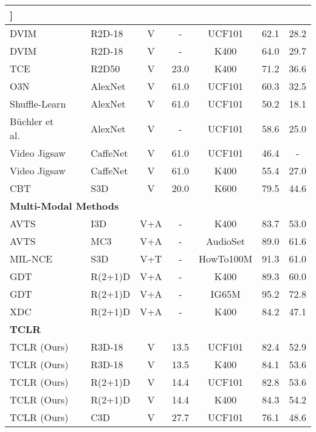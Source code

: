 \documentclass[10pt,twocolumn,letterpaper]{article}
\begin{document}
\begin{table*}[h!]
\centering
\begin{tabular}{lclccccc} 
\hline

\hline

\hline\-3mm]\multicolumn{8}{l}{\textbf{Specialized Architectures}} \\
\hline
DVIM~\cite{dvim}          &         & R2D-18     & V & -            & UCF101 & 62.1  & 28.2     \\
DVIM~\cite{dvim}          &         & R2D-18     & V & -            & K400 & 64.0  & 29.7   \\
TCE~\cite{tce}                 &         & R2D50& V          & 23.0         & K400 & 71.2  & 36.6   \\ 
O3N~\cite{fernando2017self}      &         & AlexNet& V           & 61.0         & UCF101 & 60.3  & 32.5      \\ 
Shuffle-Learn~\cite{misra2016shuffle}              &         & AlexNet& V           & 61.0         & UCF101 & 50.2  & 18.1       \\ 
B\"uchler et al.~\cite{buchler2018improving} &         & AlexNet& V  & -            & UCF101 & 58.6  & 25.0        \\ 
Video Jigsaw~\cite{videojigsaw}             &        & CaffeNet& V          & 61.0         & UCF101 & 46.4  & -     \\
Video Jigsaw~\cite{videojigsaw}             &        & CaffeNet& V          & 61.0         & K400  & 55.4  & 27.0   \\
CBT~\cite{xdc}                  &        & S3D & V               & 20.0         & K600  & 79.5  & 44.6   \\ 


\hline
\multicolumn{8}{l}{\textbf{Multi-Modal Methods}} \\
\hline
AVTS~\cite{gdt} &   & I3D & V+A & - & K400 & 83.7 & 53.0 \\
AVTS~\cite{gdt} &   & MC3 & V+A & - & AudioSet & 89.0 & 61.6 \\
MIL-NCE~\cite{milnce} &  & S3D & V+T & - & HowTo100M & 91.3 & 61.0 \\
GDT~\cite{gdt} &   & R(2+1)D & V+A & - & K400 & 89.3 & 60.0 \\
GDT~\cite{gdt} &   & R(2+1)D & V+A & - & IG65M & 95.2 & 72.8 \\
XDC~\cite{gdt} &   & R(2+1)D & V+A & - & K400 & 84.2 & 47.1 \\
\hline
\multicolumn{8}{l}{\textbf{TCLR}} \\
\hline
TCLR (Ours)   &        & R3D-18& V      & 13.5         & UCF101 & 82.4  & 52.9       \\ 
TCLR (Ours)   &        & R3D-18& V      & 13.5         & K400 & 84.1     & 53.6      \\ 
TCLR (Ours)   &        & R(2+1)D& V           & 14.4         & UCF101 & 82.8     & 53.6         \\ 
TCLR (Ours)   &        & R(2+1)D& V           & 14.4         & K400 &  84.3     & 54.2      \\ 
TCLR (Ours)   &        & C3D& V               & 27.7         & UCF101 & 76.1     & 48.6     \\
\hline


\end{tabular}
\end{table*}
\end{document}
